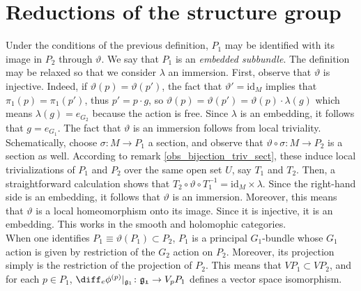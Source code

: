 \section{Reductions of the structure group} \label{sec_reductions_structure_group}


Under the conditions of the previous definition, \(P_1\) may be identified with its image in \(P_2\) through \(\vartheta\). We say that \(P_1\) is an \textit{embedded subbundle}. The definition may be relaxed so that we consider \(\lambda\) an immersion. First, observe that \(\vartheta\) is injective. Indeed, if \(\vartheta(p)=\vartheta (p')\), the fact that \(\vartheta'=\mathrm{id}_M\) implies that \(\pi_1(p)=\pi_1(p')\), thus \(p'=p\cdot g\), so \(\vartheta(p)=\vartheta(p')=\vartheta(p)\cdot \lambda(g)\) which means \(\lambda(g)=e_{G_2}\) because the action is free. Since \(\lambda\) is an embedding, it follows that \(g=e_{G_1}\). The fact that \(\vartheta\) is an immersion follows from local triviality. Schematically, choose \(\sigma\colon M \to P_1\) a section, and observe that \(\vartheta \circ \sigma\colon M \to P_2\) is a section as well. According to remark \ref{obs_bijection_triv_sect}, these induce local trivializations of \(P_1\) and \(P_2\) over the same open set \(U\), say \(T_1\) and \(T_2\). Then, a straightforward calculation shows that \(T_2 \circ \vartheta \circ T_1^{-1}=\mathrm{id}_M \times \lambda\). Since the right-hand side is an embedding, it follows that \(\vartheta\) is an immersion. Moreover, this means that \(\vartheta\) is a local homeomorphism onto its image. Since it is injective, it is an embedding. This works in the smooth and holomophic categories.\\

When one identifies \(P_1 \equiv \vartheta(P_1) \subset P_2\), \(P_1\) is a principal \(G_1\)-bundle whose \(G_1\) action is given by restriction of the \(G_2\) action on \(P_2\). Moreover, its projection simply is the restriction of the projection of \(P_2\). This means that \(VP_1 \subset VP_2\), and for each \(p \in P_1\), \(\diff_e\phi^{(p)}|_{\mathfrak{g}_1}\colon \mathfrak{g_1} \to V_pP_1\) defines a vector space isomorphism.

